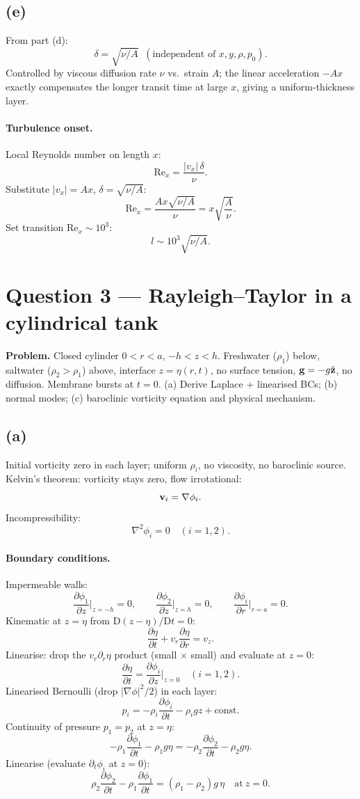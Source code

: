 \documentclass[11pt]{article}
\newcommand{\D}{\mathrm{D}}
\newcommand{\pd}[2]{\frac{\partial #1}{\partial #2}}
\begin{document}
\subsection*{(e)}

From part (d):
\[ \boxed{\;\delta = \sqrt{\nu/A}\;\;(\text{independent of }x,y,\rho,p_0).\;} \]
Controlled by viscous diffusion rate $\nu$ vs.\ strain $A$; the linear acceleration $-Ax$ exactly compensates the longer transit time at large $x$, giving a uniform-thickness layer.

\paragraph{Turbulence onset.} Local Reynolds number on length $x$:
\[ \mathrm{Re}_x = \frac{|v_x|\,\delta}{\nu}. \]
Substitute $|v_x|=Ax$, $\delta=\sqrt{\nu/A}$:
\[ \mathrm{Re}_x = \frac{Ax\sqrt{\nu/A}}{\nu} = x\sqrt{\frac{A}{\nu}}. \]
Set transition $\mathrm{Re}_x\sim 10^3$:
\[ \boxed{\;l\sim 10^3\sqrt{\nu/A}.\;} \]

\section*{Question 3 --- Rayleigh--Taylor in a cylindrical tank}

\textbf{Problem.} Closed cylinder $0<r<a$, $-h<z<h$. Freshwater ($\rho_1$) below, saltwater ($\rho_2>\rho_1$) above, interface $z=\eta(r,t)$, no surface tension, $\vb g=-g\hat{\vb z}$, no diffusion. Membrane bursts at $t=0$. (a) Derive Laplace + linearised BCs; (b) normal modes; (c) baroclinic vorticity equation and physical mechanism.

\subsection*{(a)}

Initial vorticity zero in each layer; uniform $\rho_i$, no viscosity, no baroclinic source. Kelvin's theorem: vorticity stays zero, flow irrotational:
\[ \vb v_i = \nabla\phi_i. \]
Incompressibility:
\[ \boxed{\;\nabla^2\phi_i = 0\quad(i=1,2).\;} \]

\paragraph{Boundary conditions.} Impermeable walls:
\[ \pd{\phi_1}{z}\bigg|_{z=-h}=0,\qquad \pd{\phi_2}{z}\bigg|_{z=h}=0,\qquad \pd{\phi_i}{r}\bigg|_{r=a}=0. \]
Kinematic at $z=\eta$ from $\D(z-\eta)/\D t=0$:
\[ \pd{\eta}{t} + v_r\pd{\eta}{r} = v_z. \]
Linearise: drop the $v_r\partial_r\eta$ product (small × small) and evaluate at $z=0$:
\[ \boxed{\;\pd{\eta}{t} = \pd{\phi_i}{z}\bigg|_{z=0}\quad(i=1,2).\;} \]
Linearised Bernoulli (drop $|\nabla\phi|^2/2$) in each layer:
\[ p_i = -\rho_i\pd{\phi_i}{t} - \rho_i g z + \text{const}. \]
Continuity of pressure $p_1=p_2$ at $z=\eta$:
\[ -\rho_1\pd{\phi_1}{t} - \rho_1 g\eta = -\rho_2\pd{\phi_2}{t} - \rho_2 g\eta. \]
Linearise (evaluate $\partial_t\phi_i$ at $z=0$):
\[ \boxed{\;\rho_2\pd{\phi_2}{t} - \rho_1\pd{\phi_1}{t} = (\rho_1-\rho_2)g\,\eta\quad\text{at}\ z=0.\;} \]
\end{document}
